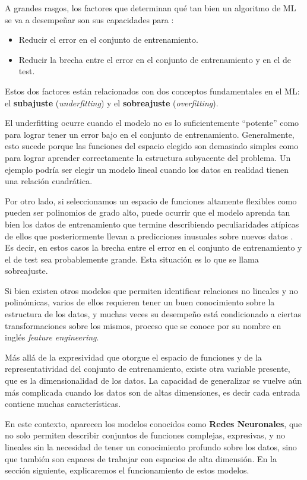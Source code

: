 \documentclass[../../main.tex]{subfiles}
\begin{document}
A grandes rasgos, los factores que determinan qué tan bien un algoritmo de ML
se va a desempeñar son sus capacidades para \cite{deep-learning}:
\begin{itemize}[itemsep=0.1cm]
    \item Reducir el error en el conjunto de entrenamiento.
    \item Reducir la brecha entre el error en el conjunto de entrenamiento y en el de
    test.
\end{itemize}

Estos dos factores están relacionados con dos conceptos fundamentales en el ML: el
\textbf{subajuste} (\textit{underfitting}) y el \textbf{sobreajuste}
(\textit{overfitting}).

El underfitting ocurre cuando el modelo no es lo suficientemente ``potente'' como para
lograr tener un error bajo en el conjunto de entrenamiento. Generalmente, esto sucede
porque las funciones del espacio elegido son demasiado simples como para lograr aprender
correctamente la estructura subyacente del problema. Un ejemplo podría ser elegir un modelo
lineal cuando los datos en realidad tienen una relación cuadrática.

Por otro lado, si seleccionamos un espacio de funciones altamente flexibles como pueden
ser polinomios de grado alto, puede ocurrir que el modelo aprenda tan bien los datos de
entrenamiento que termine describiendo peculiaridades atípicas de ellos que posteriormente
llevan a predicciones inusuales sobre nuevos datos \cite{prince2024understanding}. Es
decir, en estos casos la brecha entre el error en el conjunto de entrenamiento y el de
test sea probablemente grande. Esta situación es lo que se llama sobreajuste.

Si bien existen otros modelos que permiten identificar relaciones no lineales y no
polinómicas, varios de ellos requieren tener un buen conocimiento sobre la estructura de
los datos, y muchas veces su desempeño está condicionado a ciertas transformaciones sobre
los mismos, proceso que se conoce por su nombre en inglés \textit{feature engineering}.

Más allá de la expresividad que otorgue el espacio de funciones y de la representatividad
del conjunto de entrenamiento, existe otra variable presente, que es la dimensionalidad
de los datos. La capacidad de generalizar se vuelve aún más complicada cuando los datos
son de altas dimensiones, es decir cada entrada contiene muchas características.

En este contexto, aparecen los modelos conocidos como \textbf{Redes Neuronales}, que
no solo permiten describir conjuntos de funciones complejas, expresivas, y no lineales
sin la necesidad de tener un conocimiento profundo sobre los datos, sino que también son
capaces de trabajar con espacios de alta dimensión. En la sección siguiente, explicaremos
el funcionamiento de estos modelos.
\end{document}

